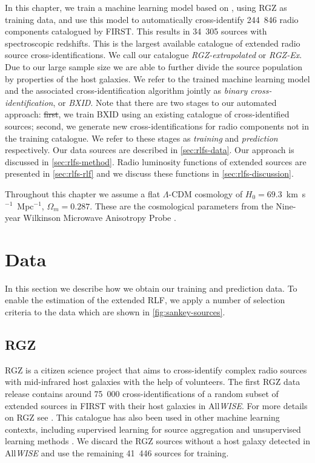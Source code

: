 \documentclass[11pt, a4paper]{book}
\newcommand{\defn}[1]{\emph{#1}}
\newcommand{\ncomponents}{244~846}
\newcommand{\nsourceszsp}{34~305}
\providecommand{\DIFaddtex}[1]{{\protect\color{blue}\uwave{#1}}} %
\providecommand{\DIFdeltex}[1]{{\protect\color{red}\sout{#1}}}                      %
\providecommand{\DIFaddbegin}{} %
\providecommand{\DIFaddend}{} %
\providecommand{\DIFdelbegin}{} %
\providecommand{\DIFdelend}{} %
\providecommand{\DIFadd}[1]{\texorpdfstring{\DIFaddtex{#1}}{#1}} %
\providecommand{\DIFdel}[1]{\texorpdfstring{\DIFdeltex{#1}}{}} %
\newcommand{\DIFscaledelfig}{0.5}
\newlength{\DIFdelgraphicswidth} %
\newlength{\DIFdelgraphicsheight} %
\newcommand{\DIFaddincludegraphics}[2][]{{\color{blue}\fbox{\DIFOincludegraphics[#1]{#2}}}} %
\newcommand{\DIFdelincludegraphics}[2][]{%
\sbox{\DIFdelgraphicsbox}{\DIFOincludegraphics[#1]{#2}}%
\settoboxwidth{\DIFdelgraphicswidth}{\DIFdelgraphicsbox} %
\settoboxtotalheight{\DIFdelgraphicsheight}{\DIFdelgraphicsbox} %
\scalebox{\DIFscaledelfig}{%
\parbox[b]{\DIFdelgraphicswidth}{\usebox{\DIFdelgraphicsbox}\\[-\baselineskip] \rule{\DIFdelgraphicswidth}{0em}}\llap{\resizebox{\DIFdelgraphicswidth}{\DIFdelgraphicsheight}{%
\setlength{\unitlength}{\DIFdelgraphicswidth}%
\begin{picture}(1,1)%
\thicklines\linethickness{2pt} %
{\color[rgb]{1,0,0}\put(0,0){\framebox(1,1){}}}%
{\color[rgb]{1,0,0}\put(0,0){\line( 1,1){1}}}%
{\color[rgb]{1,0,0}\put(0,1){\line(1,-1){1}}}%
\end{picture}%
}\hspace*{3pt}}} %
} %
\DeclareRobustCommand{\DIFaddbegin}{\DIFOaddbegin \let\includegraphics\DIFaddincludegraphics} %
\DeclareRobustCommand{\DIFaddend}{\DIFOaddend \let\includegraphics\DIFOincludegraphics} %
\DeclareRobustCommand{\DIFdelbegin}{\DIFOdelbegin \let\includegraphics\DIFdelincludegraphics} %
\DeclareRobustCommand{\DIFdelend}{\DIFOaddend \let\includegraphics\DIFOincludegraphics} %
\begin{document}
In this chapter, we train a machine learning model based on \citet{alger18radio}, using RGZ as training data, and
use this model to automatically cross-identify \ncomponents{} radio components catalogued by FIRST. This results in \nsourceszsp{} sources
with spectroscopic redshifts. This is the largest available catalogue of
extended radio source cross-identifications. We call our catalogue
\defn{RGZ-extrapolated} or \defn{RGZ-Ex}. Due to our large sample size we are able to further divide the
source population by properties of the host galaxies. We refer to the trained machine learning model and the associated cross-identification algorithm jointly as \defn{binary cross-identification}, or \defn{BXID}. Note that there are two stages to our automated approach: \DIFdelbegin \DIFdel{first}\DIFdelend \DIFaddbegin \DIFadd{First}\DIFaddend , we train BXID using an existing catalogue of cross-identified sources; second, we generate new cross-identifications for radio components not in the training catalogue. We refer to these stages as \defn{training} and \defn{prediction} respectively. Our data sources are described in \autoref{sec:rlfs-data}. Our approach is discussed in \autoref{sec:rlfs-method}. Radio luminosity functions of extended sources are presented in \autoref{sec:rlfs-rlf} and we discuss these functions in \autoref{sec:rlfs-discussion}.

Throughout this chapter we assume a flat $\Lambda$-CDM cosmology of \linebreak $H_0 =
69.3$~km~s$^{-1}$~Mpc$^{-1}$, $\Omega_m = 0.287$. These are the cosmological
parameters from the Nine-year Wilkinson Microwave Anisotropy Probe
\citep[WMAP9;][]{hinshaw13wmap9}.

\section{Data} \label{sec:rlfs-data}

In this section we describe how we obtain our training and prediction data. To enable the estimation of the extended RLF, we apply a number of selection criteria to the data which are shown in \autoref{fig:sankey-sources}.

    \subsection{RGZ} \label{sec:rlfs-rgz-data}

    RGZ is a citizen science project that aims to cross-identify complex radio sources with mid-infrared host galaxies with the help of volunteers. The first RGZ data release contains around 75~000 cross-identifications of a random subset of extended sources in FIRST with their host galaxies in All\emph{WISE}. For more details on RGZ see \citet{banfield15}. This catalogue has also been used in other machine learning contexts, including supervised learning for source aggregation \citep{wu19claran} and unsupervised learning methods \citep{galvin19som,ralph19ae}. We discard the RGZ sources without a host galaxy detected in All\emph{WISE} and use the remaining 41~446 sources for training.
\end{document}
